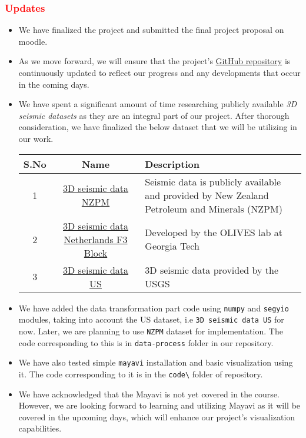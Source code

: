 \documentclass[11pt,a4paper]{article}
\begin{document}
\subsubsection*{\textcolor{red}{Updates}}
\begin{itemize}
    \item We have finalized the project and submitted the final project proposal on moodle.
    \item As we move forward, we will ensure that the project's \href{https://github.com/rajagond/AE6102_sifar}{GitHub repository} is continuously updated to reflect our progress and any developments that occur in the coming days.
    \item We have spent a significant amount of time researching publicly available \textit{3D seismic datasets} as they are an integral part of our project. After thorough consideration, we have finalized the below dataset that we will be utilizing in our work.
    
     \begin{tabular}{||c | c | p{9cm}||} 
     \hline
     \textbf{S.No} & \textbf{Name} & \textbf{Description} \\ [0.5ex] 
     \hline \hline 
     1 & \href{https://public.3.basecamp.com/p/JyT276MM7krjYrMoLqLQ6xST}{3D seismic data NZPM} & Seismic data is publicly available and provided by New Zealand Petroleum and Minerals (NZPM) \\ 
     \hline 
     2 & \href{https://github.com/olivesgatech/facies_classification_benchmark#dataset}{3D seismic data Netherlands F3 Block} & Developed by the OLIVES lab at Georgia Tech \\
     \hline 
     3 & \href{https://pubs.usgs.gov/of/2009/1151/data/seismics/segy/}{3D seismic data US} & 3D seismic data provided by the USGS \\
     \hline
    \end{tabular}

    \item We have added the data transformation part code using \verb!numpy! and \verb!segyio! modules, taking into account the US dataset, i.e \verb!3D seismic data US! for now. Later, we are planning to use \verb!NZPM! dataset for implementation. The code corresponding to this is in \verb!data-process! folder in our repository.

    \item We have also tested simple \verb!mayavi! installation and basic visualization using it. The code corresponding to it is in the \verb!code\! folder of repository.
        
    \item We have acknowledged that the Mayavi is not yet covered in the course. However, we are looking forward to learning and utilizing Mayavi as it will be covered in the upcoming days, which will enhance our project's visualization capabilities.
\end{itemize}
\end{document}
